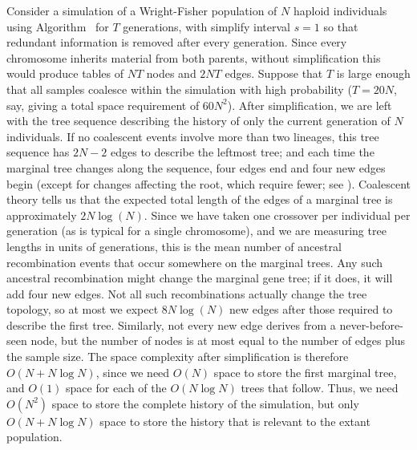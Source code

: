 \documentclass{article}
\begin{document}
Consider a simulation of a Wright-Fisher population of $N$ haploid individuals
using Algorithm~ for $T$ generations,
with simplify interval $s = 1$ so that redundant information is removed after every generation.
Since every chromosome inherits material from both parents,
without simplification this would produce tables of
$NT$ nodes and
$2NT$ edges.
Suppose that $T$ is large enough that all samples coalesce within the simulation with high probability
($T = 20N$, say, giving a total space requirement of $60N^2$).
After simplification, we are left with the tree sequence describing the history
of only the current generation of $N$ individuals.
If no coalescent events involve more than two lineages, this tree sequence has $2N-2$ edges to describe the leftmost tree;
and each time the marginal tree changes along the sequence,
four edges end and four new edges begin
(except for changes affecting the root, which require fewer; see \citet{kelleher2016efficient}).
Coalescent theory tells us that
the expected total length of the edges of a marginal tree is approximately $2N\log(N)$.
Since we have taken one crossover per individual per generation (as is typical for a single chromosome),
and we are measuring tree lengths in units of generations,
this is the mean number of ancestral recombination events that occur somewhere on the marginal trees.
Any such ancestral recombination might change the marginal gene tree;
if it does, it will add four new edges.
Not all such recombinations actually change the tree topology,
so at most we expect $8N\log(N)$ new edges after those required to describe the first tree.
Similarly, not every new edge derives from a never-before-seen node,
but the number of nodes is at most equal to the number of edges plus the sample size.
The space complexity after simplification is therefore $O(N + N\log N)$, since
we need $O(N)$ space to store the first marginal tree, and $O(1)$ space
for each of the $O(N \log N)$ trees that follow. Thus, we need $O(N^2)$ space
to store the complete history of the simulation, but only $O(N + N \log N)$
space to store the history that is relevant to the extant population.
\end{document}
